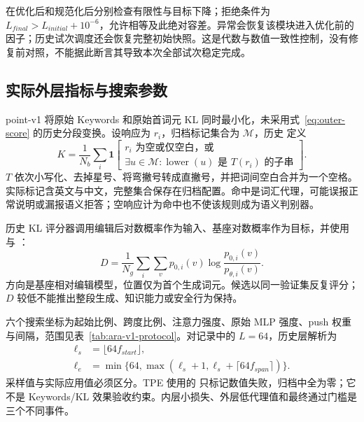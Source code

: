  在优化后和规范化后分别检查有限性与目标下降；拒绝条件为 $L_{final}>L_{initial}+10^{-6}$，允许相等及此绝对容差。异常会恢复该模块进入优化前的因子；历史试次调度还会恢复完整初始快照。这是代数与数值一致性控制，没有修复前对照，不能据此断言其导致本次全部试次稳定完成。

\subsection{实际外层指标与搜索参数}

point-v1 将原始 Keywords 和原始首词元 KL 同时最小化，未采用式~\eqref{eq:outer-score} 的历史分段变换。设响应为 $r_i$，归档标记集合为 $\mathcal M$，历史  定义
\begin{equation}
 K=\frac{1}{N_b}\sum_i\mathbf 1\!\left[
 \begin{array}{l}
 r_i\text{ 为空或仅空白，或}\\
 \exists u\in\mathcal M:\operatorname{lower}(u)
 \text{ 是 }T(r_i)\text{ 的子串}
 \end{array}\right].
 \label{eq:local-keywords}
\end{equation}
$T$ 依次小写化、去掉星号、将弯撇号转成直撇号，并把词间空白合并为一个空格。实际标记含英文与中文，完整集合保存在归档配置。命中是词汇代理，可能误报正常说明或漏报语义拒答；空响应计为命中也不使该规则成为语义判别器。

历史 KL 评分器调用编辑后对数概率作为输入、基座对数概率作为目标，并使用  与 ：
\begin{equation}
 D=\frac{1}{N_g}\sum_i\sum_v p_{0,i}(v)
 \log\frac{p_{0,i}(v)}{p_{\theta,i}(v)}.
 \label{eq:local-kl}
\end{equation}
方向是基座相对编辑模型，位置仅为首个生成词元。候选以同一验证集反复评分；$D$ 较低不能推出整段生成、知识能力或安全行为保持。

六个搜索坐标为起始比例、跨度比例、注意力强度、原始 MLP 强度、push 权重与间隔，范围见表~\ref{tab:ara-v1-protocol}。对记录中的 $L=64$，历史层解析为
\begin{align}
 \ell_s&=\lfloor64 f_{start}\rfloor,\\
 \ell_e&=\min\{64,\max(\ell_s+1,\ell_s+\lceil64 f_{span}\rceil)\}.
\end{align}
采样值与实际应用值必须区分。TPE 使用的  只标记数值失败，归档中全为零；它不是 Keywords/KL 效果验收约束。内层小损失、外层低代理值和最终通过门槛是三个不同事件。
